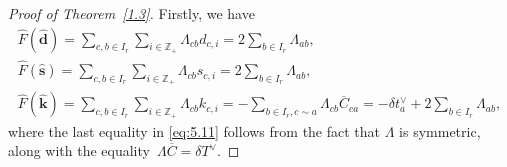 \documentclass[pdftex]{sigma}
\numberwithin{equation}{section}
\begin{document}
\begin{proof}[Proof of Theorem~\ref{1.3}]
Firstly, we have
\begin{gather}%
\widehat{F}(\widehat{\mathbf{d}})
=\sum_{c,b\in I_r}\sum_{i\in\mathbb{Z}_+}\Lambda_{cb}d_{c,i}
=2\sum_{b\in I_r}\Lambda_{ab},\label{eq:5.9}\\
\widehat{F}(\widehat{\mathbf{s}})
=\sum_{c,b\in I_r}\sum_{i\in\mathbb{Z}_+}\Lambda_{cb}s_{c,i}
=2\sum_{b\in I_r}\Lambda_{ab},\\
\widehat{F}(\widehat{\mathbf{k}})
=\sum_{c,b\in I_r}\sum_{i\in\mathbb{Z}_+}\Lambda_{cb}k_{c,i}
=-\sum_{b\in I_r,c\sim a}\Lambda_{cb}\overline{C}_{ca}
=-\delta t_a^{\vee}+2\sum_{b\in I_r}\Lambda_{ab},\label{eq:5.11}
\end{gather}
where the last equality in \eqref{eq:5.11} follows from the fact that $\Lambda$ is symmetric, along with the equality~${\Lambda\overline{C}=\delta T^{\vee}}$.


\end{proof}
\end{document}
